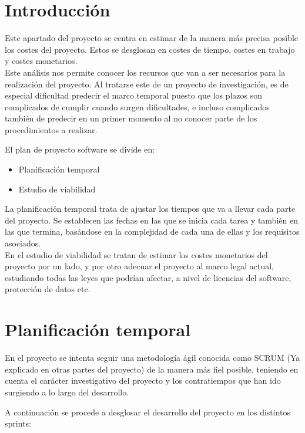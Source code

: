 	
\section{Introducción}

Este apartado del proyecto se centra en estimar de la manera más precisa posible los costes del proyecto. Estos se desglosan en costes de tiempo, costes en trabajo y costes monetarios.\\Este análisis nos permite conocer los recursos que van a ser necesarios para la realización del proyecto.
Al tratarse este de un proyecto de investigación, es de especial dificultad predecir el marco temporal puesto que los plazos son complicados de cumplir cuando surgen dificultades, e incluso complicados también de predecir en un primer momento al no conocer parte de los procedimientos a realizar.

El plan de proyecto software se divide en:
\begin{itemize}
\item Planificación temporal
\item Estudio de viabilidad
\end{itemize}

La planificación temporal trata de ajustar los tiempos que va a llevar cada parte del proyecto. Se establecen las fechas en las que se inicia cada tarea y también en las que termina, basándose en la complejidad de cada una de ellas y los requisitos asociados.
\\
 En el estudio de viabilidad se tratan de estimar los costes monetarios del proyecto por un lado, y por otro adecuar el proyecto al marco legal actual, estudiando todas las leyes que podrían afectar, a nivel de licencias del software, protección de datos etc.


\section{Planificación temporal}
 En el proyecto se intenta seguir una metodología ágil conocida como SCRUM (Ya explicado en otras partes del proyecto) de la manera más fiel posible, teniendo en cuenta el carácter investigativo del proyecto y los contratiempos que han ido surgiendo a lo largo del desarrollo.

A continuación se procede a desglosar el desarrollo del proyecto en los distintos sprints:

